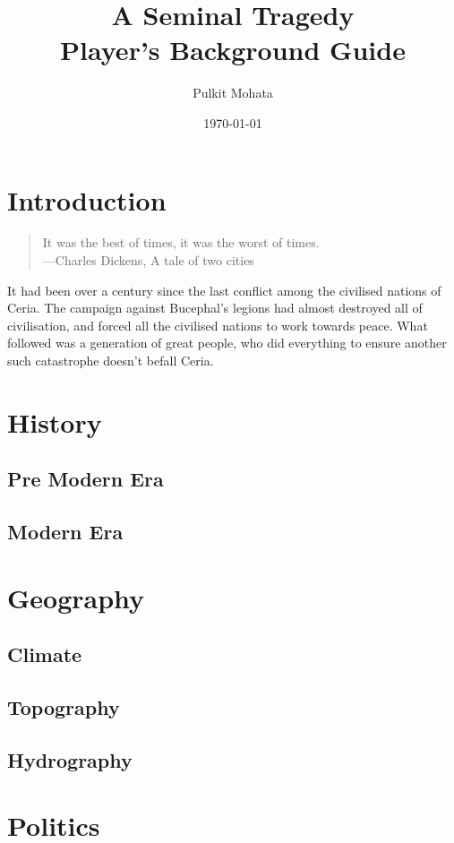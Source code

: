 \documentclass[11pt]{article}
\author{Pulkit Mohata}
\date{\today}
\title{A Seminal Tragedy\\\medskip
\large Player's Background Guide}
\begin{document}
\maketitle
\tableofcontents

\section{Introduction}
\label{sec:org875150f}
\begin{quote}
It was the best of times, it was the worst of times. \\
---Charles Dickens, A tale of two cities
\end{quote}
It had been over a century since the last conflict among the civilised nations of Ceria. The campaign against Bucephal's legions had almost destroyed all of civilisation, and forced all the civilised nations to work towards peace. What followed was a generation of great people, who did everything to ensure another such catastrophe doesn't befall Ceria.
\section{History}
\label{sec:org9b4307f}
\subsection{Pre Modern Era}
\label{sec:org12300a5}
\subsection{Modern Era}
\label{sec:org71db4fc}
\section{Geography}
\label{sec:orge100106}
\subsection{Climate}
\label{sec:org27336ad}
\subsection{Topography}
\label{sec:org2736a9c}
\subsection{Hydrography}
\label{sec:org87a22c0}
\section{Politics}
\label{sec:org142a14c}
\end{document}
